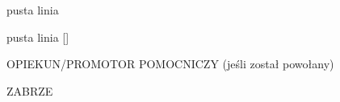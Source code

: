 \begin{titlepage}
    	\par\noindent\centering\large\MakeLowercase{\capitalisewords{\Wydzial}}
    	\par\noindent\centering\large{\color{white}pusta linia}
    	\par\noindent\centering\large{\color{white}pusta linia}
        \StrLen{\Opiekun}[\mystringlen]
        {
            \par\noindent\centering\large OPIEKUN/PROMOTOR POMOCNICZY (jeśli został powołany)%
            \par\noindent\centering\large\Opiekun%
            \vfill%
        }
        {
            \par\noindent\centering\large%
            \par\noindent\centering\large%
            \vfill%
        }%
    	\par\noindent\centering\large ZABRZE~\Rok
    	\newpage
    	\thispagestyle{empty}
    	\renewcommand{\baselinestretch}{1.5}
    	\flushleft\normalfont\normalsize\justify
    	\par{}\newline\TematPracy
        \par{}\newline\Streszczenie
        \par{}\newline\SlowaKluczowe
        \par{}\newline\TematPracyANG
        \par{}\newline\StreszczenieANG
        \par{}\newline\SlowaKluczoweANG
    \end{titlepage}
    \clearpage{\pagestyle{empty}\hfill\cleardoublepage}
    
